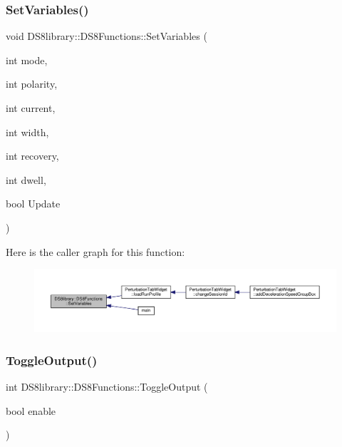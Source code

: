 \mbox{\label{class_d_s8library_1_1_d_s8_functions_a40d9d40b7e8a437e4ceb54eb1aa80d48}} 
\subsubsection{\texorpdfstring{Set\+Variables()}{SetVariables()}}
{\footnotesize\ttfamily void D\+S8library\+::\+D\+S8\+Functions\+::\+Set\+Variables (\begin{DoxyParamCaption}\item[{int}]{mode,  }\item[{int}]{polarity,  }\item[{int}]{current,  }\item[{int}]{width,  }\item[{int}]{recovery,  }\item[{int}]{dwell,  }\item[{bool}]{Update }\end{DoxyParamCaption})}

Here is the caller graph for this function\+:
\nopagebreak
\begin{figure}[H]
\begin{center}
\leavevmode
\includegraphics[width=350pt]{class_d_s8library_1_1_d_s8_functions_a40d9d40b7e8a437e4ceb54eb1aa80d48_icgraph}
\end{center}
\end{figure}
\mbox{\label{class_d_s8library_1_1_d_s8_functions_a62ae825413cda1f339d17a9d0e50bd14}} 
\subsubsection{\texorpdfstring{Toggle\+Output()}{ToggleOutput()}}
{\footnotesize\ttfamily int D\+S8library\+::\+D\+S8\+Functions\+::\+Toggle\+Output (\begin{DoxyParamCaption}\item[{bool}]{enable }\end{DoxyParamCaption})}

